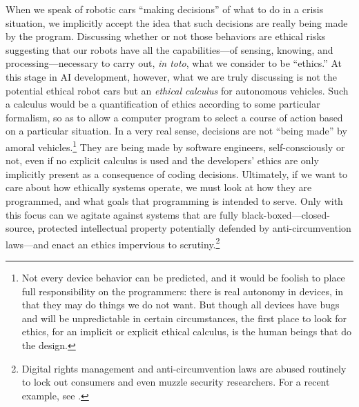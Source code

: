 When we
speak of robotic cars ``making decisions'' of what to do in a crisis
situation, we implicitly accept the idea that such decisions are
really being made by the program. Discussing whether or not those
behaviors are ethical risks suggesting that our robots have all the
capabilities---of sensing, knowing, and processing---necessary to
carry out, \emph{in toto}, what we consider to be ``ethics.'' At this
stage in AI development, however, what we are truly discussing is not
the potential ethical robot cars but an \emph{ethical calculus} for
autonomous vehicles. Such a calculus would be a quantification of
ethics according to some particular formalism, so as to allow a
computer program to select a course of action based on a particular
situation. In a very real sense, decisions are not
``being made'' by amoral vehicles.\footnote{Not every device behavior
can be predicted, and it would be foolish to place full responsibility
on the programmers: there is real autonomy in devices, in that they
may do things we do not want. But though all devices have bugs and
will be unpredictable in certain circumstances, the first place to
look for ethics, for an implicit or explicit ethical calculus, is the
human beings 
that do the design.} They are being made by software engineers,
self-consciously or not, even if no
explicit calculus is used and the developers' ethics are only
implicitly present as a consequence of coding decisions. Ultimately,
if we want to care about how ethically systems
operate, we must look at how they are programmed, and what goals that
programming is intended to serve. Only with this focus can we agitate
against systems that are fully black-boxed---closed-source, protected
intellectual property potentially defended by anti-circumvention
laws---and enact an ethics impervious to scrutiny.\footnote{Digital
  rights management and anti-circumvention laws are abused routinely
  to lock out consumers and even muzzle security researchers. For a
  recent example, see \cite{higgins}.
}



